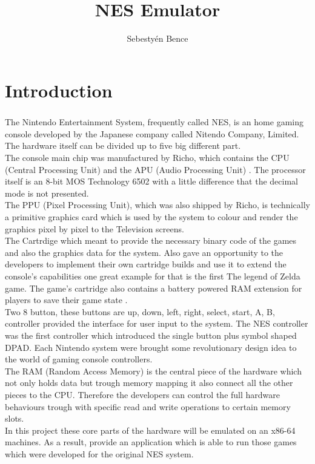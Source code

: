 \documentclass[]{report}
\title{NES Emulator}
\author{Sebestyén Bence}
\begin{document}
\maketitle

\tableofcontents

\clearpage

\chapter{Introduction}

\paragraph{}
The Nintendo Entertainment System, frequently called NES, is an home gaming console developed by the Japanese company called Nitendo Company, Limited. The hardware itself can be divided up to five big different part. 
\\
The console main chip was manufactured by Richo, which contains the CPU (Central Processing Unit) and the APU (Audio Processing Unit) \cite{CPU}.  
The processor itself is an 8-bit MOS Technology 6502 with a little difference that the decimal mode is not presented. 
\\
The PPU (Pixel Processing Unit), which was also shipped by Richo, is technically a primitive graphics card which is used by the system to colour and render the graphics pixel by pixel to the Television screens.
\\
The Cartrdige which meant to provide the necessary binary code of the games and also the graphics data for the system. Also gave an opportunity to the developers to implement their own cartridge builds and use it to extend the console's capabilities one great example for that is the first The legend of Zelda game. The game's cartridge also contains a battery powered RAM extension for players to save their game state \cite{ZELD}.
\\
Two 8 button, these buttons are up, down, left, right, select, start, A, B, controller provided the interface for user input to the system. The NES controller was the first controller which introduced the single button plus symbol shaped DPAD. Each Nintendo system were brought some revolutionary design idea to the world of gaming console controllers.
\\
The RAM (Random Access Memory) is the central piece of the hardware which not only holds data but 
trough memory mapping it also connect all the other pieces to the CPU. Therefore the developers can control the full hardware behaviours trough with specific read and write operations to certain memory slots.
\\
In this project these core parts of the hardware will be emulated on an x86-64 machines. As a result, provide an application which is able to run those games which were developed for the original NES system.
\end{document}
